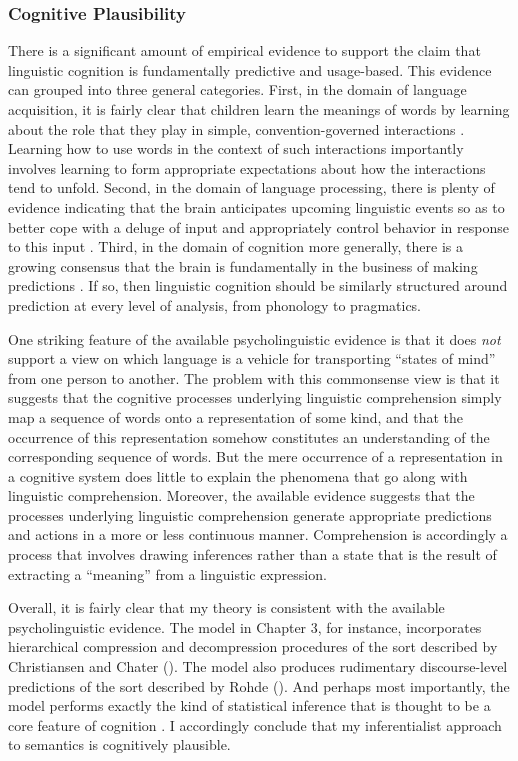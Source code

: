 \subsubsection{Cognitive Plausibility}

There is a significant amount of empirical evidence to support the claim that linguistic cognition is fundamentally predictive and usage-based. This evidence can grouped into three general categories. First, in the domain of language acquisition, it is fairly clear that children learn the meanings of words by learning about the role that they play in simple, convention-governed interactions \citep{Tomasello:2005,Tomasello:2001}. Learning how to use words in the context of such interactions importantly involves learning to form appropriate expectations about how the interactions tend to unfold. Second, in the domain of language processing, there is plenty of evidence indicating that the brain anticipates upcoming linguistic events so as to better cope with a deluge of input and appropriately control behavior in response to this input \citep{Christiansen:2015,Pickering:2007,Pickering:2013}. Third, in the domain of cognition more generally, there is a growing consensus that the brain is fundamentally in the business of making predictions \citep{clark:2013}. If so, then linguistic cognition should be similarly structured around prediction at every level of analysis, from phonology to pragmatics. 

One striking feature of the available psycholinguistic evidence is that it does \textit{not} support a view on which language is a vehicle for transporting ``states of mind'' from one person to another. The problem with this commonsense view is that it suggests that the cognitive processes underlying linguistic comprehension simply map a sequence of words onto a representation of some kind, and that the occurrence of this representation somehow constitutes an understanding of the corresponding sequence of words. But the mere occurrence of a representation in a cognitive system does little to explain the phenomena that go along with linguistic comprehension. Moreover, the available evidence suggests that the processes underlying linguistic comprehension generate appropriate predictions and actions in a more or less continuous manner. Comprehension is accordingly a process that involves drawing inferences rather than a state that is the result of extracting a ``meaning'' from a linguistic expression.

Overall, it is fairly clear that my theory is consistent with the available psycholinguistic evidence. The model in Chapter 3, for instance, incorporates hierarchical compression and decompression procedures of the sort described by Christiansen and Chater (\citeyear{Christiansen:2015}). The model also produces rudimentary discourse-level predictions of the sort described by Rohde (\citeyear{Rohde:2008}). And perhaps most importantly, the model performs exactly the kind of statistical inference that is thought to be a core feature of cognition \citep{Eliasmith:2007,clark:2013}. I accordingly conclude that my inferentialist approach to semantics is cognitively plausible.  


